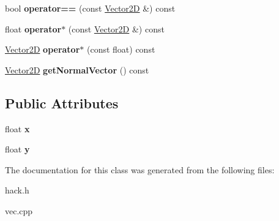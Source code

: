 \begin{DoxyCompactItemize}
\item 
\hypertarget{class_vector2_d_aaaa3859e5b2387804433ab3c6f0d4195}{bool {\bfseries operator==} (const \hyperlink{class_vector2_d}{Vector2\-D} \&) const }\label{class_vector2_d_aaaa3859e5b2387804433ab3c6f0d4195}

\item 
\hypertarget{class_vector2_d_a8ef79708aada9d64f6e35f2f07d80dc1}{float {\bfseries operator$\ast$} (const \hyperlink{class_vector2_d}{Vector2\-D} \&) const }\label{class_vector2_d_a8ef79708aada9d64f6e35f2f07d80dc1}

\item 
\hypertarget{class_vector2_d_ac6b31ce90fa1e8bad9b26ffe409c26ed}{\hyperlink{class_vector2_d}{Vector2\-D} {\bfseries operator$\ast$} (const float) const }\label{class_vector2_d_ac6b31ce90fa1e8bad9b26ffe409c26ed}

\item 
\hypertarget{class_vector2_d_a71c67fe20a71ee7eeb96aa93c528d092}{\hyperlink{class_vector2_d}{Vector2\-D} {\bfseries get\-Normal\-Vector} () const }\label{class_vector2_d_a71c67fe20a71ee7eeb96aa93c528d092}

\end{DoxyCompactItemize}
\subsection*{Public Attributes}
\begin{DoxyCompactItemize}
\item 
\hypertarget{class_vector2_d_aeb4253ba6555251d010ea4450619029e}{float {\bfseries x}}\label{class_vector2_d_aeb4253ba6555251d010ea4450619029e}

\item 
\hypertarget{class_vector2_d_a85215519d3f71d0e6be7d636346f3b7d}{float {\bfseries y}}\label{class_vector2_d_a85215519d3f71d0e6be7d636346f3b7d}

\end{DoxyCompactItemize}


The documentation for this class was generated from the following files\-:\begin{DoxyCompactItemize}
\item 
hack.\-h\item 
vec.\-cpp\end{DoxyCompactItemize}
